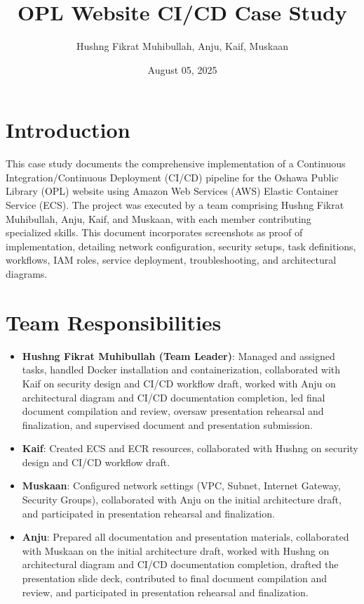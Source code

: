 \documentclass[a4paper,12pt]{article}
\title{OPL Website CI/CD Case Study}
\author{Hushng Fikrat Muhibullah, Anju, Kaif, Muskaan}
\date{August 05, 2025}
\begin{document}
\maketitle

\section{Introduction}
This case study documents the comprehensive implementation of a Continuous Integration/Continuous Deployment (CI/CD) pipeline for the Oshawa Public Library (OPL) website using Amazon Web Services (AWS) Elastic Container Service (ECS). The project was executed by a team comprising Hushng Fikrat Muhibullah, Anju, Kaif, and Muskaan, with each member contributing specialized skills. This document incorporates screenshots as proof of implementation, detailing network configuration, security setups, task definitions, workflows, IAM roles, service deployment, troubleshooting, and architectural diagrams.

\section{Team Responsibilities}
\begin{itemize}
    \item \textbf{Hushng Fikrat Muhibullah (Team Leader)}: Managed and assigned tasks, handled Docker installation and containerization, collaborated with Kaif on security design and CI/CD workflow draft, worked with Anju on architectural diagram and CI/CD documentation completion, led final document compilation and review, oversaw presentation rehearsal and finalization, and supervised document and presentation submission.
    \item \textbf{Kaif}: Created ECS and ECR resources, collaborated with Hushng on security design and CI/CD workflow draft.
    \item \textbf{Muskaan}: Configured network settings (VPC, Subnet, Internet Gateway, Security Groups), collaborated with Anju on the initial architecture draft, and participated in presentation rehearsal and finalization.
    \item \textbf{Anju}: Prepared all documentation and presentation materials, collaborated with Muskaan on the initial architecture draft, worked with Hushng on architectural diagram and CI/CD documentation completion, drafted the presentation slide deck, contributed to final document compilation and review, and participated in presentation rehearsal and finalization.
\end{itemize}
\end{document}
